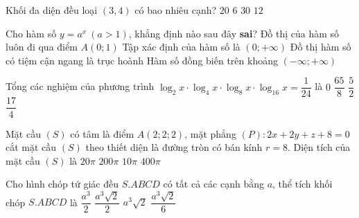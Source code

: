 \begin{ex}%
Khối đa diện đều loại $(3,4)$ có bao nhiêu cạnh?
\choice
{$20$}
{$6$}
{$30$}
{\True $12$}
\end{ex}

\begin{ex}%
Cho hàm số $y=a^x ~ (a>1)$, khẳng định nào sau đây  \textbf{sai}?
\choice
{Đồ thị của hàm số luôn đi qua điểm $A(0;1)$}
{\True Tập xác định của hàm số là $(0;+\infty)$}
{Đồ thị hàm số có tiệm cận ngang là trục hoành}
{Hàm số đồng biến trên khoảng $(-\infty;+\infty)$}
\end{ex}

\begin{ex}%
Tổng các nghiệm của phương trình $\log_2x \cdot \log_4 x \cdot \log_8 x  \cdot \log_{16} x =\dfrac{1}{24}$ là
\choice
{$0$}
{$\dfrac{65}{8}$}
{\True $\dfrac{5}{2}$}
{$\dfrac{17}{4}$}
\end{ex}

\begin{ex}%
Mặt cầu $(S)$ có tâm là điểm $A(2;2;2) $, mặt phẳng $(P) : 2x + 2y + z + 8 = 0 $ cắt mặt cầu $(S)$ theo thiết diện
là đường tròn có bán kính $r = 8$. Diện tích của mặt cầu $(S)$ là
\choice
{$20\pi$}
{$200\pi$}
{$10\pi$}
{\True $400\pi$}
\end{ex}

\begin{ex}%
Cho hình chóp tứ giác đều $S.ABCD$ có tất cả các cạnh bằng $a$, thể tích khối chóp $S.ABCD$ là
\choice
{$\dfrac{a^3}{2}$}
{$\dfrac{a^3\sqrt{2}}{2}$}
{$a^3\sqrt{2}$}
{\True $\dfrac{a^3\sqrt{2}}{6}$}
\end{ex}

